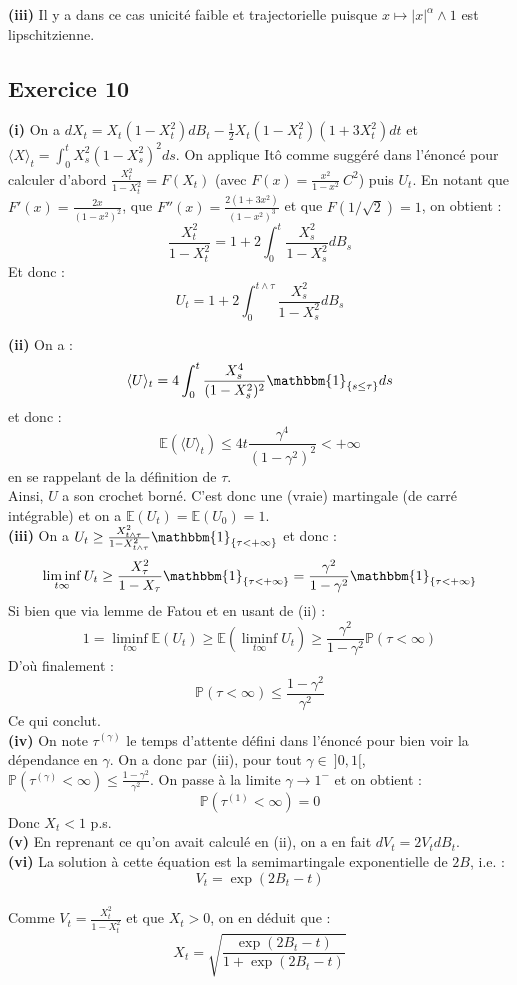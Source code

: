 \documentclass[a4paper,12pt]{article}
\newcommand{\E}{\mathbb{E}}
\newcommand{\prob}{\mathbb{P}}
\newcommand{\ind}{\mathbbm{1}}
\begin{document}
\textbf{(iii)} Il y a dans ce cas unicité faible et trajectorielle puisque $x \mapsto |x|^{\alpha} \wedge 1$ est lipschitzienne.

\subsection{Exercice 10} 
\textbf{(i)} On a $dX_t = X_t (1-X_t^2)dB_t - \frac{1}{2} X_t (1-X_t^2)(1+3X_t^2)dt$ et $\langle X \rangle_t = \int_0^t X_s^2 (1-X_s^2)^2 ds$. On applique Itô comme suggéré dans l'énoncé pour calculer d'abord $	\frac{X_t^2}{1-X_t^2} = F(X_t)$ (avec $F(x)=\frac{x^2}{1-x^2} \ C^2$) puis $U_t$. En notant que $F'(x)= \frac{2x}{(1-x^2)^2}$, que $F''(x)=\frac{2(1+3x^2)}{(1-x^2)^3}$ et que $F(1/\sqrt{2}) = 1$, on obtient :
$$\frac{X_t^2}{1-X_t^2} = 1 + 2 \int_0^t \frac{X_s^2}{1-X_s^2} dB_s$$
Et donc :
$$U_t = 1 + 2 \int_0^{t\wedge \tau} \frac{X_s^2}{1-X_s^2} dB_s$$

\textbf{(ii)} On a :
$$\langle U \rangle_t = 4 \int_0^t \frac{X_s^4}{(1-X_s^2)^2} \ind_{\{ s \leq \tau \}} ds$$
et donc :
$$\E \left( \langle U \rangle_t \right) \leq 4t \frac{\gamma^4}{(1- \gamma^2)^2} < + \infty$$
en se rappelant de la définition de $\tau$.  \\

Ainsi, $U$ a son crochet borné. C'est donc une (vraie) martingale (de carré intégrable) et on a $\E (U_t)= \E (U_0)=1$. \\

\textbf{(iii)} On a  $U_t \geq \frac{X^2_{t \wedge \tau}}{1-X_{t \wedge \tau}^2} \ind_{\{ \tau < + \infty \}}$ et donc :
$$\liminf_{t \infty} U_t \geq \frac{X_{\tau}^2}{1-X_{\tau}} \ind_{\{ \tau < + \infty \}} = \frac{\gamma^2}{1- \gamma^2} \ind_{\{ \tau < + \infty \}}$$
Si bien que via lemme de Fatou et en usant de (ii) :
$$1 = \liminf_{t \infty} \E (U_t) \geq \E \left( \liminf_{t \infty} U_t \right) \geq \frac{\gamma^2}{1-\gamma^2} \prob (\tau < \infty)$$
D'où finalement :
$$\prob (\tau < \infty ) \leq \frac{1- \gamma^2}{\gamma^2}$$
Ce qui conclut. \\

\textbf{(iv)} On note $\tau^{(\gamma)}$ le temps d'attente défini dans l'énoncé pour bien voir la dépendance en $\gamma$. On a donc par (iii), pour tout $\gamma \in \ ]0,1[$, $\prob \left( \tau^{(\gamma)} < \infty \right) \leq \frac{1-\gamma^2}{\gamma^2}$. On passe à la limite $\gamma \rightarrow 1^-$ et on obtient :
$$\prob (\tau^{(1)} < \infty ) = 0$$
Donc $X_t < 1$ p.s. \\

\textbf{(v)} En reprenant ce qu'on avait calculé en (ii), on a en fait $dV_t = 2V_t dB_t$. \\

\textbf{(vi)} La solution à cette équation est la semimartingale exponentielle de $2B$, i.e. :
$$V_t = \exp{(2B_t-t)}$$ \\
Comme $V_t = \frac{X^2_t}{1-X^2_t}$ et que $X_t > 0$, on en déduit que :
$$X_t = \sqrt{\frac{\exp{(2B_t-t)}}{1+\exp{(2B_t-t)}}}$$
\end{document}
